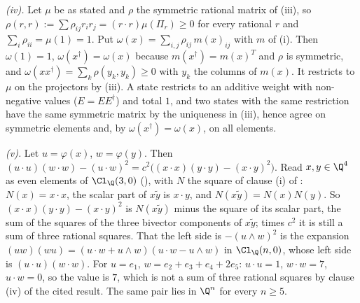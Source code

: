 \emph{(iv).} Let $\mu$ be as stated and $\rho$ the symmetric rational matrix of (iii), so $\rho(r,r) := \sum\rho_{ij}r_{i}r_{j} = (r \cdot r)\mu(\Pi_{r}) \ge 0$ for every rational $r$ and $\sum_{i}\rho_{ii} = \mu(1) = 1$. Put $\omega(x) = \sum_{i,j}\rho_{ij}\,m(x)_{ij}$ with $m$ of (i). Then $\omega(1) = 1$, $\omega(x^{\dagger}) = \omega(x)$ because $m(x^{\dagger}) = m(x)^{T}$ and $\rho$ is symmetric, and $\omega(xx^{\dagger}) = \sum_{k}\rho(y_{k}, y_{k}) \ge 0$ with $y_{k}$ the columns of $m(x)$. It restricts to $\mu$ on the projectors by (iii). A state restricts to an additive weight with non-negative values ($E = EE^{\dagger}$) and total $1$, and two states with the same restriction have the same symmetric matrix by the uniqueness in (iii), hence agree on symmetric elements and, by $\omega(x^{\dagger}) = \omega(x)$, on all elements.

\emph{(v).} Let $u = \varphi(x)$, $w = \varphi(y)$. Then $(u \cdot u)(w \cdot w) - (u \cdot w)^{2} = c^{2}\bigl((x \cdot x)(y \cdot y) - (x \cdot y)^{2}\bigr)$. Read $x, y \in \Q^{4}$ as even elements of $\Cl_{\Q}(3,0)$ (), with $N$ the square of clause (i) of : $N(x) = x \cdot x$, the scalar part of $x\tilde{y}$ is $x \cdot y$, and $N(x\tilde{y}) = N(x)N(y)$. So $(x \cdot x)(y \cdot y) - (x \cdot y)^{2}$ is $N(x\tilde{y})$ minus the square of its scalar part, the sum of the squares of the three bivector components of $x\tilde{y}$; times $c^{2}$ it is still a sum of three rational squares. That the left side is $-(u \wedge w)^{2}$ is the expansion $(uw)(wu) = (u \cdot w + u \wedge w)(u \cdot w - u \wedge w)$ in $\Cl_{\Q}(n,0)$, whose left side is $(u \cdot u)(w \cdot w)$. For $u = e_{1}$, $w = e_{2} + e_{3} + e_{4} + 2e_{5}$: $u \cdot u = 1$, $w \cdot w = 7$, $u \cdot w = 0$, so the value is $7$, which is not a sum of three rational squares by clause (iv) of the cited result. The same pair lies in $\Q^{n}$ for every $n \ge 5$.
